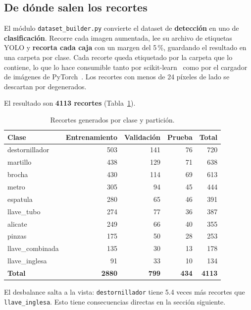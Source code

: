 \documentclass[11pt,a4paper]{article}
\newcommand{\clase}[1]{\texttt{#1}}
\begin{document}
\subsection{De dónde salen los recortes}

El módulo \texttt{dataset\_builder.py} convierte el dataset de \textbf{detección} en uno de
\textbf{clasificación}. Recorre cada imagen aumentada, lee su archivo de etiquetas YOLO y
\textbf{recorta cada caja} con un margen del 5\,\%, guardando el resultado en una carpeta por
clase. Cada recorte queda etiquetado por la carpeta que lo contiene, lo que lo hace consumible
tanto por scikit-learn~\cite{sklearn} como por el cargador de imágenes de PyTorch~\cite{pytorch}.
Los recortes con menos de 24 píxeles de lado se descartan por degenerados.

El resultado son \textbf{4113 recortes} (Tabla~\ref{tab:crops}).

\begin{table}[htbp]
\centering
\caption{Recortes generados por clase y partición.}
\label{tab:crops}
\small
\begin{tabular}{@{}lrrrr@{}}
\toprule
\textbf{Clase} & \textbf{Entrenamiento} & \textbf{Validación} & \textbf{Prueba} & \textbf{Total} \\
\midrule
destornillador   & 503 & 141 & 76 & 720 \\
martillo         & 438 & 129 & 71 & 638 \\
brocha           & 430 & 114 & 69 & 613 \\
metro            & 305 &  94 & 45 & 444 \\
espatula         & 280 &  65 & 46 & 391 \\
llave\_tubo      & 274 &  77 & 36 & 387 \\
alicate          & 249 &  66 & 40 & 355 \\
pinzas           & 175 &  50 & 28 & 253 \\
llave\_combinada & 135 &  30 & 13 & 178 \\
llave\_inglesa   &  91 &  33 & 10 & 134 \\
\midrule
\textbf{Total}   & \textbf{2880} & \textbf{799} & \textbf{434} & \textbf{4113} \\
\bottomrule
\end{tabular}
\end{table}

El desbalance salta a la vista: \clase{destornillador} tiene 5.4 veces más recortes que
\clase{llave\_inglesa}. Esto tiene consecuencias directas en la sección siguiente.
\end{document}
